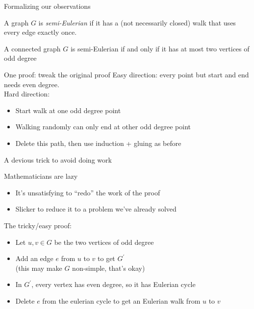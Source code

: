 \documentclass{beamer}
\begin{document}
\begin{frame}{Formalizing our observations}

  \begin{definition} A graph $G$ is \emph{semi-Eulerian} if it has a (not necessarily closed) walk that uses every edge exactly once.
  \end{definition}

  \begin{theorem}A connected graph $G$ is semi-Eulerian if and only if it has at most two vertices of odd degree
  \end{theorem}
  \begin{block}{One proof: tweak the original proof}
    Easy direction: every point but start and end needs even degree. \\
    Hard direction:
    \begin{itemize}
    \item Start walk at one odd degree point
    \item Walking randomly can only end at other odd degree point
    \item Delete this path, then use induction + gluing as before
    \end{itemize}
    \end{block}


\end{frame}


\begin{frame}{A devious trick to avoid doing work}
  \begin{block}{Mathematicians are lazy}
    \begin{itemize}
      \item It's unsatisfying to ``redo'' the work of the proof  
      \item Slicker to reduce it to a problem we've already solved
    \end{itemize}
    
  \end{block}
  \begin{block}{The tricky/easy proof:}
    \begin{itemize}
    \item Let $u, v\in G$ be the two vertices of odd degree
    \item Add an edge $e$ from $u$ to $v$ to get $G^\prime$ \\
      (this may make $G$ non-simple, that's okay)
    \item In $G^\prime$, every vertex has even degree, so it has Eulerian cycle
    \item Delete $e$ from the eulerian cycle to get an Eulerian walk from $u$ to $v$
    
        \end{itemize}

    \end{block}
  

\end{frame}
\end{document}
